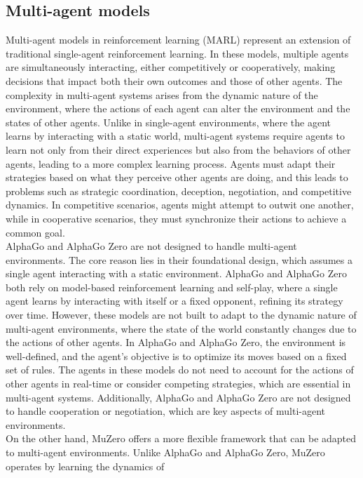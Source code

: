 \subsection{Multi-agent models}
Multi-agent models in reinforcement learning (MARL) represent an extension of traditional single-agent reinforcement learning. 
In these models, multiple agents are simultaneously 
interacting, either competitively or cooperatively, making decisions 
that impact both their own outcomes and those of other agents. The complexity 
in multi-agent systems arises from the dynamic nature of the environment, 
where the actions of each agent can alter the environment and the states 
of other agents. Unlike in single-agent environments, where the agent 
learns by interacting with a static world, multi-agent systems require 
agents to learn not only from their direct experiences but also from the 
behaviors of other agents, leading to a more complex learning process. 
Agents must adapt their strategies based on what they perceive other agents 
are doing, and this leads to problems such as strategic coordination, 
deception, negotiation, and competitive dynamics. In competitive scenarios, 
agents might attempt to outwit one another, while in cooperative scenarios, 
they must synchronize their actions to achieve a common goal\cite{AD2}.\\
AlphaGo and AlphaGo Zero are not designed to handle 
multi-agent environments. The core reason lies in their foundational 
design, which assumes a single agent interacting with a static 
environment. AlphaGo and AlphaGo Zero both rely on model-based reinforcement 
learning and self-play, where a single agent learns by interacting 
with itself or a fixed opponent, refining its strategy over time. 
However, these models are not built to adapt to the dynamic nature of 
multi-agent environments, where the state of the world constantly 
changes due to the actions of other agents. In AlphaGo and AlphaGo Zero, 
the environment is well-defined, and the agent’s objective is to 
optimize its moves based on a fixed set of rules. The agents in these 
models do not need to account for the actions of other agents in 
real-time or consider competing strategies, which are essential in 
multi-agent systems. Additionally, AlphaGo and AlphaGo Zero are not 
designed to handle cooperation or negotiation, which are 
key aspects of multi-agent environments.\\
On the other hand, MuZero offers a more flexible
framework that can be adapted to multi-agent environments. Unlike 
AlphaGo and AlphaGo Zero, MuZero operates by learning the dynamics of 

